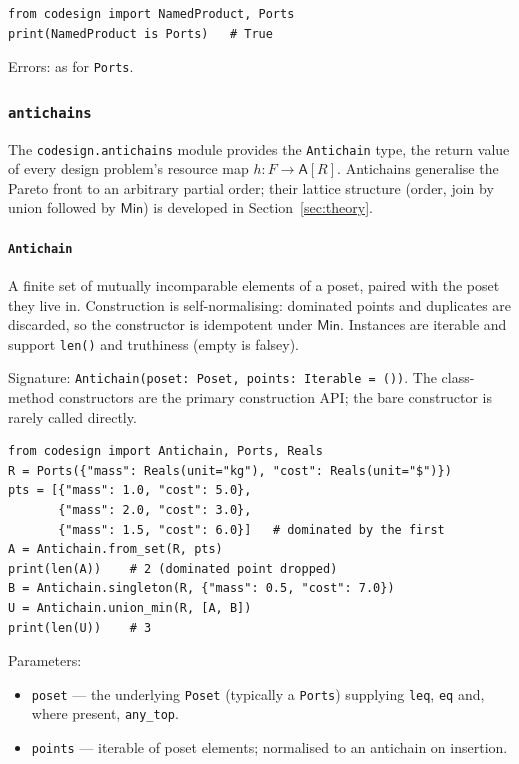 \documentclass[11pt,a4paper]{article}
\newcommand{\Min}{\mathsf{Min}}
\newcommand{\Antichain}{\mathsf{A}}
\begin{document}
\begin{lstlisting}
from codesign import NamedProduct, Ports
print(NamedProduct is Ports)   # True
\end{lstlisting}

Errors: as for \texttt{Ports}.

\subsubsection{\texttt{antichains}}
\label{ref:antichains}

The \texttt{codesign.antichains} module provides the \texttt{Antichain}
type, the return value of every design problem's resource map
$h : F \to \Antichain[R]$. Antichains generalise the Pareto front to an
arbitrary partial order; their lattice structure (order, join by union
followed by $\Min$) is developed in Section~\ref{sec:theory}.

\paragraph{\texttt{Antichain}}
\label{ref:antichains:antichain}
A finite set of mutually incomparable elements of a poset, paired with the
poset they live in. Construction is self-normalising: dominated points and
duplicates are discarded, so the constructor is idempotent under $\Min$.
Instances are iterable and support \texttt{len()} and truthiness (empty is
falsey).

Signature: \texttt{Antichain(poset: Poset, points: Iterable = ())}.
The class-method constructors are the primary construction API; the bare
constructor is rarely called directly.

\begin{lstlisting}
from codesign import Antichain, Ports, Reals
R = Ports({"mass": Reals(unit="kg"), "cost": Reals(unit="$")})
pts = [{"mass": 1.0, "cost": 5.0},
       {"mass": 2.0, "cost": 3.0},
       {"mass": 1.5, "cost": 6.0}]   # dominated by the first
A = Antichain.from_set(R, pts)
print(len(A))    # 2 (dominated point dropped)
B = Antichain.singleton(R, {"mass": 0.5, "cost": 7.0})
U = Antichain.union_min(R, [A, B])
print(len(U))    # 3
\end{lstlisting}

Parameters:
\begin{itemize}[nosep]
\item \texttt{poset} --- the underlying \texttt{Poset} (typically a
  \texttt{Ports}) supplying \texttt{leq}, \texttt{eq} and, where present,
  \texttt{any\_top}.
\item \texttt{points} --- iterable of poset elements; normalised to an
  antichain on insertion.
\end{itemize}
\end{document}
